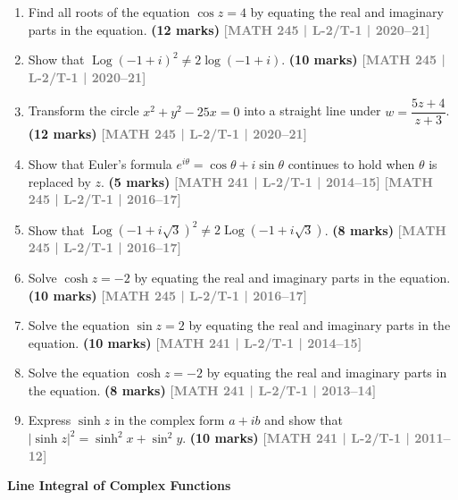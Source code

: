 \documentclass[12pt,a4paper]{article}
\newcommand{\yr}[1]{\hfill\textcolor{gray}{\small\textbf{[#1]}}}
\newcommand{\mk}[1]{\textcolor{orange!70!black}{\small\textbf{(#1 marks)}}}
\newcommand{\subtopic}[2]{%
  \vspace{10pt}
  \noindent\begin{tcolorbox}[colback=#1!8,colframe=#1,boxrule=0.6pt,arc=4pt,
    left=6pt,right=6pt,top=4pt,bottom=4pt]
    \small\bfseries\textcolor{#1}{#2}
  \end{tcolorbox}
  \vspace{2pt}
}
\begin{document}
\begin{enumerate}\item Find all roots of the equation $\cos z = 4$ by equating the real and imaginary parts in the equation.
\mk{12} \yr{MATH 245 | L-2/T-1 | 2020--21}

\item Show that $\operatorname{Log}(-1+i)^{2} \neq 2\log(-1+i)$.
\mk{10} \yr{MATH 245 | L-2/T-1 | 2020--21}

\item Transform the circle $x^{2}+y^{2}-25x=0$ into a straight line under $w=\dfrac{5z+4}{z+3}$.
\mk{12} \yr{MATH 245 | L-2/T-1 | 2020--21}

\item Show that Euler's formula $e^{i\theta}=\cos \theta+i\sin \theta$ continues to hold when $\theta$ is replaced by $z$.
\mk{5} \yr{MATH 241 | L-2/T-1 | 2014--15} \yr{MATH 245 | L-2/T-1 | 2016--17}

\item Show that $\operatorname{Log}(-1+i\sqrt{3})^{2}\neq 2\operatorname{Log}(-1+i\sqrt{3})$.
\mk{8} \yr{MATH 245 | L-2/T-1 | 2016--17}

\item Solve $\cosh z=-2$ by equating the real and imaginary parts in the equation.
\mk{10} \yr{MATH 245 | L-2/T-1 | 2016--17}

\item Solve the equation $\sin z = 2$ by equating the real and imaginary parts in the equation.
\mk{10} \yr{MATH 241 | L-2/T-1 | 2014--15}

\item Solve the equation $\cosh z = -2$ by equating the real and imaginary parts in the equation.
\mk{8} \yr{MATH 241 | L-2/T-1 | 2013--14}

\item Express $\sinh z$ in the complex form $a+ib$ and show that $|\sinh z|^{2}=\sinh^{2}x+\sin^{2}y$.
\mk{10} \yr{MATH 241 | L-2/T-1 | 2011--12}

\end{enumerate}

\subtopic{cE}{Line Integral of Complex Functions}
\label{sub:s5-lineint}
\end{document}
